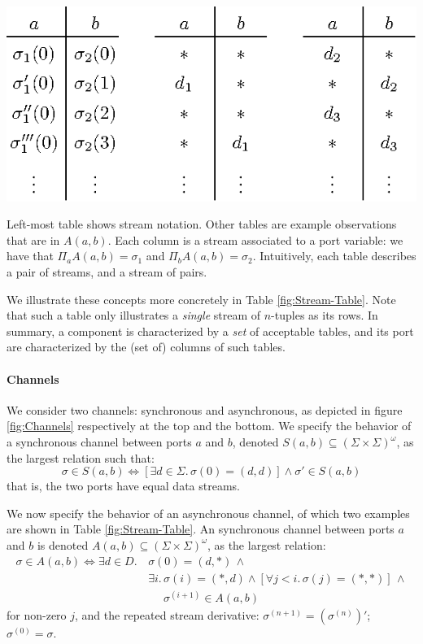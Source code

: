 \begin{table}[b]
	\begin{center}
		\includegraphics[scale=0.8]{pic/stream-table}
	\end{center}
	\caption{
		\label{fig:Stream-Table}Left-most table shows stream notation. Other tables are example observations that are in $A(a,b)$.  Each column is a stream associated to a port variable: we have that $\Pi_a A(a,b)=\sigma_1$ and $\Pi_b A(a,b)=\sigma_2$. Intuitively, each table describes a pair of streams, and a stream of pairs.}
\end{table}

We illustrate these concepts more concretely in Table \ref{fig:Stream-Table}.
Note that such a table only illustrates a \emph{single} stream of $n$-tuples as its rows.
In summary, a component is characterized by a \emph{set} of acceptable tables,
and its port are characterized by the (set of) columns of such tables.

\paragraph{Channels} We consider two channels: synchronous and asynchronous,
as depicted in figure \ref{fig:Channels} respectively at the top and the bottom.
We specify the behavior of a synchronous channel between ports $a$ and $b$, denoted $S(a,b)\subseteq(\Sigma\times\Sigma)^{\omega}$, as the largest relation such that:
$$\sigma\in S(a,b)\Leftrightarrow\left[\exists d\in \Sigma.\,\sigma(0)=(d,d)\right]\land\sigma'\in S(a,b)$$
that is, the two ports have equal data streams.

We now specify the behavior of an asynchronous channel, of which two examples are shown
in Table \ref{fig:Stream-Table}. An synchronous channel between ports $a$ and $b$ is denoted $A(a,b)\subseteq(\Sigma\times\Sigma)^{\omega}$,
as the largest relation:
\begin{align*}
	\sigma\in A(a,b)\Leftrightarrow\exists d\in D.\, & \sigma(0)=(d,*)\,\land\\
	& \exists i.\,\sigma(i)=(*,d)\land\left[\forall j<i.\,\sigma(j)=(*,*)\right]\,\land\\
	& \phantom{\exists i.\,}\sigma^{(i+1)}\in A(a,b)
\end{align*}
for non-zero $j$, and the repeated stream derivative: $\sigma^{(n+1)}=\left(\sigma^{(n)}\right)'$; $\sigma^{(0)}=\sigma$.

